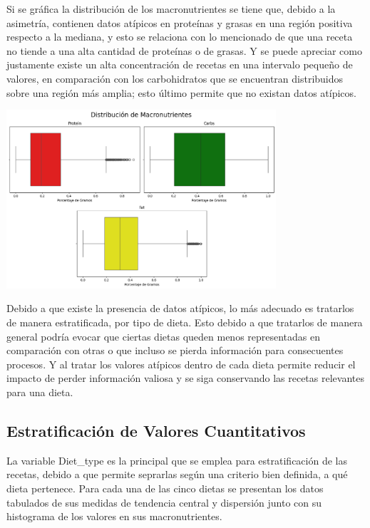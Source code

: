 \documentclass[12pt,a4paper]{article}
\begin{document}
    Si se gráfica la distribución de los macronutrientes se tiene que, debido 
    a la asimetría, contienen datos atípicos en proteínas y grasas en una región 
    positiva respecto a la mediana, y esto se relaciona con lo mencionado de que 
    una receta no tiende a una alta cantidad de proteínas o de grasas. Y se puede 
    apreciar como justamente existe un alta concentración de recetas en una intervalo pequeño 
    de valores, en comparación con los carbohidratos que se encuentran distribuidos 
    sobre una región más amplia; esto último permite que no existan datos atípicos. 
    \begin{center}
        \includegraphics[width=0.75\textwidth]{Resources/2_02_plot_01.png}
    \end{center}

    Debido a que existe la presencia de datos atípicos, lo más adecuado es tratarlos 
    de manera estratificada, por tipo de dieta. Esto debido a que tratarlos de manera 
    general podría evocar que ciertas dietas queden menos representadas en comparación 
    con otras o que incluso se pierda información para consecuentes procesos. Y al 
    tratar los valores atípicos dentro de cada dieta permite reducir el impacto de 
    perder información valiosa y se siga conservando las recetas relevantes para una dieta.

    \subsection{Estratificación de Valores Cuantitativos}
    La variable Diet\_type es la principal que se emplea para 
    estratificación de las recetas, debido a que permite seprarlas 
    según una criterio bien definida, a qué dieta pertenece. Para cada 
    una de las cinco dietas se presentan los datos tabulados de sus 
    medidas de tendencia central y dispersión junto con su histograma 
    de los valores en sus macronutrientes.\\
\end{document}
